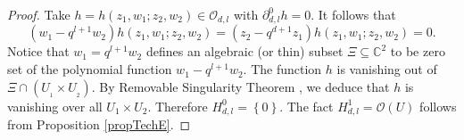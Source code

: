 \documentclass[12pt,reqno]{amsart}%
\theoremstyle{plain}
\numberwithin{theorem}{section} \numberwithin{equation}{section}
\numberwithin{lemma}{section}
\numberwithin{remark}{section}
\numberwithin{example}{section}
\numberwithin{proposition}{section}
\numberwithin{definition}{section}
\numberwithin{corollary}{section}
\begin{document}
\begin{proof}
Take $h=h\left(  z_{1},w_{1};z_{2},w_{2}\right)  \in\mathcal{O}_{d,l}$ with
$\partial_{d,l}^{0}h=0$. It follows that
\[
\left(  w_{1}-q^{l+1}w_{2}\right)  h\left(  z_{1},w_{1};z_{2},w_{2}\right)
=\left(  z_{2}-q^{d+1}z_{1}\right)  h\left(  z_{1},w_{1};z_{2},w_{2}\right)
=0.
\]
Notice that $w_{1}=q^{l+1}w_{2}$ defines an algebraic (or thin) subset
$\Xi\subseteq\mathbb{C}^{2}$ to be zero set of the polynomial function
$w_{1}-q^{l+1}w_{2}$. The function $h$ is vanishing out of $\Xi\cap\left(
U_{_{1}}\times U_{_{2}}\right)  $. By Removable Singularity Theorem
\cite[I.C.3]{GRo}, we deduce that $h$ is vanishing over all $U_{1}\times
U_{2}$. Therefore $H_{d,l}^{0}=\left\{  0\right\}  $. The fact $H_{d,l}%
^{1}=\mathcal{O}\left(  U\right)  $ follows from Proposition \ref{propTechE}.


\end{proof}
\end{document}
